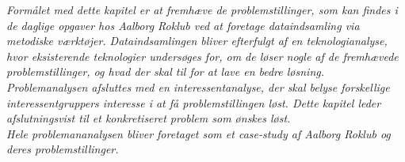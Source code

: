 
\label{sec:problemanalyse_indledning}

\textit{Formålet med dette kapitel er at fremhæve de problemstillinger, som kan findes i de daglige opgaver hos Aalborg Roklub ved at foretage dataindsamling via metodiske værktøjer. Dataindsamlingen bliver efterfulgt af en teknologianalyse, hvor eksisterende teknologier undersøges for, om de løser nogle af de fremhævede problemstillinger, og hvad der skal til for at lave en bedre løsning. Problemanalysen afsluttes med en interessentanalyse, der skal belyse forskellige interessentgruppers interesse i at få problemstillingen løst. Dette kapitel leder afslutningsvist til et konkretiseret problem som ønskes løst.}\\

\textit{Hele problemananalysen bliver foretaget som et case-study af Aalborg Roklub og deres problemstillinger.}